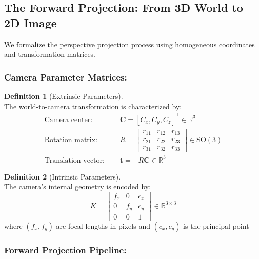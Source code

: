 \documentclass[12pt]{article}
\newcommand{\R}{\mathbb{R}}
\newcommand{\vect}[1]{\bm{#1}}
\theoremstyle{definition}
\newtheorem{definition}{Definition}[subsection]
\begin{document}
\newpage

\subsection{The Forward Projection: From 3D World to 2D Image} \label{sec:forward_projection}

We formalize the perspective projection process using homogeneous coordinates and transformation matrices.

\subsubsection*{Camera Parameter Matrices:}

\begin{definition}[Extrinsic Parameters] \label{def:extrinsic} ~\\
The world-to-camera transformation is characterized by:
\begin{align}
\text{Camera center: } &\quad \vect{C} = [C_x, C_y, C_z]^\mathsf{T} \in \R^3 \\
\text{Rotation matrix: } &\quad R = \begin{bmatrix}
    r_{11} & r_{12} & r_{13} \\
    r_{21} & r_{22} & r_{23} \\
    r_{31} & r_{32} & r_{33}
\end{bmatrix} \in \text{SO}(3) \\
\text{Translation vector: } &\quad \vect{t} = -R \vect{C} \in \R^3
\end{align}
\end{definition}

\begin{definition}[Intrinsic Parameters] \label{def:intrinsic} ~\\
The camera's internal geometry is encoded by:
\begin{equation}
K = \begin{bmatrix}
    f_x & 0 & c_x \\
    0 & f_y & c_y \\
    0 & 0 & 1
\end{bmatrix} \in \R^{3 \times 3} \label{eq:intrinsic}
\end{equation}
where $(f_x, f_y)$ are focal lengths in pixels and $(c_x, c_y)$ is the principal point
\end{definition}

\subsubsection*{Forward Projection Pipeline:}
\end{document}
